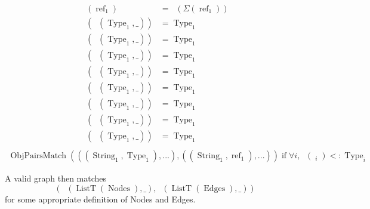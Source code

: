 \documentclass{article}
\DeclareMathOperator{\ListT}{ListT}
\DeclareMathOperator{\String}{String}
\DeclareMathOperator{\Type}{Type}
\DeclareMathOperator{\Value}{Value_\Sigma}
\DeclareMathOperator{\StringV}{StringV_\Sigma}
\DeclareMathOperator{\NumberV}{NumberV_\Sigma}
\DeclareMathOperator{\BooleanV}{BooleanV_\Sigma}
\DeclareMathOperator{\ObjV}{ObjV_\Sigma}
\DeclareMathOperator{\ListV}{ListV_\Sigma}
\DeclareMathOperator{\SetV}{SetV_\Sigma}
\DeclareMathOperator{\MapV}{MapV_\Sigma}
\DeclareMathOperator{\UnionV}{UnionV_\Sigma}
\DeclareMathOperator{\ValueType}{ValueType_\Sigma}
\DeclareMathOperator{\textref}{ref}
\DeclareMathOperator{\ObjPairsMatch}{ObjPairsMatch}
\DeclareMathOperator{\textif}{ if }
\newcommand{\ValueRef}{\textref}
\newcommand{\ValueDeref}[1]{\Sigma(#1)}
\begin{document}
\begin{align*}
    \ValueType(\ValueRef_1) &= \ValueType(\ValueDeref{\ValueRef_1}) \\
    \ValueType(\StringV(\Type_1, \_)) &= \Type_1 \\
    \ValueType(\NumberV(\Type_1, \_)) &= \Type_1 \\
    \ValueType(\BooleanV(\Type_1, \_)) &= \Type_1 \\
    \ValueType(\ObjV(\Type_1, \_)) &= \Type_1 \\
    \ValueType(\UnionV(\Type_1, \_)) &= \Type_1 \\
    \ValueType(\ListV(\Type_1, \_)) &= \Type_1 \\
    \ValueType(\SetV(\Type_1, \_)) &= \Type_1 \\
    \ValueType(\MapV(\Type_1, \_)) &= \Type_1 \\
\end{align*}
\begin{align*}
    \ObjPairsMatch(((\String_1, \Type_1),...), ((\String_1, \ValueRef_1), ...)) 
    \textif \forall i, \ValueType(\Value_i) <: \Type_i
\end{align*}

A valid graph then matches 
\[(\ListV(\ListT(\operatorname{Nodes}), \_), \ListV(\ListT(\operatorname{Edges}), \_))\]
for some appropriate definition of Nodes and Edges.
\end{document}
